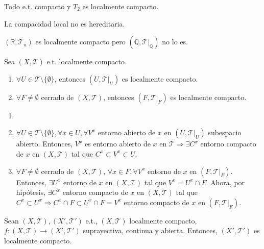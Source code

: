 \begin{cor}
  Todo e.t. compacto y $T_{2}$ es localmente compacto.
\end{cor}

\begin{obs}
  La compacidad local no es hereditaria.
\end{obs}

\begin{ejm}
  $( \mathbb{R}, \mathcal{T}_{u} )$ es localmente compacto pero $( \mathbb{Q}, \mathcal{T}|_{\mathbb{Q}})$ no lo es.
\end{ejm}

\begin{prop}
  Sea $( X, \mathcal{T} )$ e.t. localmente compacto.
  \begin{enumerate}[label=(\roman*)]
    \item $\forall U \in \mathcal{T} \setminus \{ \emptyset \}$, entonces $( U, \mathcal{T}|_{U})$ es localmente compacto.
    \item $\forall F \neq \emptyset$ cerrado de $( X, \mathcal{T} )$, entonces $( F, \mathcal{T}|_{F})$ es localmente compacto.
  \end{enumerate}
\end{prop}

\begin{dem}
  \begin{enumerate}[label=(\roman*)]
    \item []
    \item $\forall U \in \mathcal{T} \setminus \{ \emptyset \}, \forall x \in U, \forall V^{x}$ entorno abierto de $x$ en $( U, \mathcal{T}|_{U})$ subespacio abierto. Entonces, $V^{x}$ es entorno abierto de $x$ en $\mathcal{T} \Rightarrow \exists C^{x}$ entorno compacto de $x$ en $( X, \mathcal{T} )$ tal que $C^{x} \subset V^{x} \subset U$.

    \item $\forall F \neq \emptyset$ cerrado de $( X, \mathcal{T} )$, $\forall x \in F, \forall V^{x}$ entorno de $x$ en $( F, \mathcal{T}|_{F})$. Entonces, $\exists U^{x}$ entorno de $x$ en $( X, \mathcal{T} )$ tal que $V^{x} = U^{x} \cap F$. Ahora, por hipótesis, $\exists C^{x}$ entorno compacto de $x$ en $( X, \mathcal{T} )$ tal que $C^{x} \subset U^{x} \Rightarrow C^{x} \cap F \subset U^{x} \cap F = V^{x}$ entorno compacto de $x$ en $( F, \mathcal{T}|_{F})$.
  \end{enumerate}
\end{dem}

\begin{prop}
  Sean $( X, \mathcal{T} ), ( X', \mathcal{T}' )$ e.t., $( X, \mathcal{T} )$ localmente compacto, $f : ( X, \mathcal{T} ) \to ( X', \mathcal{T}' )$ suprayectiva, continua y abierta. Entonces, $( X', \mathcal{T}' )$ es localmente compacto.
\end{prop}

